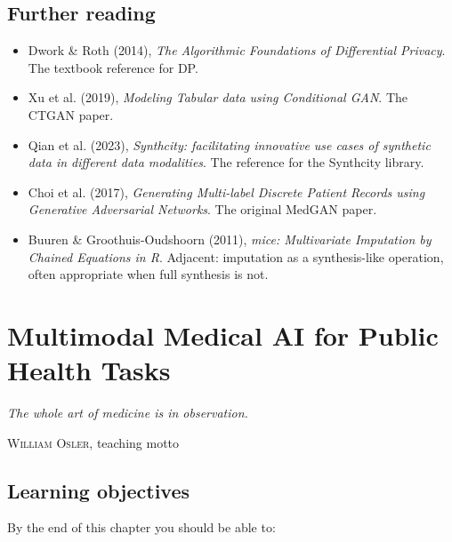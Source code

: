 \documentclass[
  letterpaper,
  11pt]{scrbook}
\providecommand{\tightlist}{%
  \setlength{\itemsep}{0pt}\setlength{\parskip}{0pt}}
\begin{document}
\section{Further reading}\label{further-reading-5}

\begin{itemize}
\tightlist
\item
  Dwork \& Roth (2014), \emph{The Algorithmic Foundations of
  Differential Privacy}. The textbook reference for DP.
\item
  Xu et al. (2019), \emph{Modeling Tabular data using Conditional GAN}.
  The CTGAN paper.
\item
  Qian et al. (2023), \emph{Synthcity: facilitating innovative use cases
  of synthetic data in different data modalities}. The reference for the
  Synthcity library.
\item
  Choi et al. (2017), \emph{Generating Multi-label Discrete Patient
  Records using Generative Adversarial Networks}. The original MedGAN
  paper.
\item
  Buuren \& Groothuis-Oudshoorn (2011), \emph{mice: Multivariate
  Imputation by Chained Equations in R}. Adjacent: imputation as a
  synthesis-like operation, often appropriate when full synthesis is
  not.
\end{itemize}

\chapter{Multimodal Medical AI for Public Health
Tasks}\label{sec-multimodal-medical}

\begin{flushright}\small

\emph{The whole art of medicine is in observation.}

\textsc{William Osler}, teaching motto

\end{flushright}

\section{Learning objectives}\label{learning-objectives-6}

By the end of this chapter you should be able to:
\end{document}
